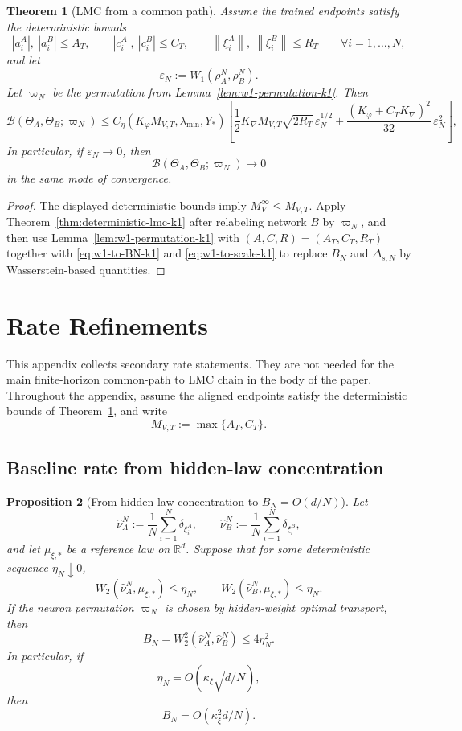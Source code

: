 \documentclass[11pt]{article}
\newtheorem{theorem}{Theorem}
\newtheorem{proposition}[theorem]{Proposition}
\theoremstyle{definition}
\newcommand{\R}{\mathbb{R}}
\newcommand{\norm}[1]{\left\lVert #1 \right\rVert}
\newcommand{\cB}{\mathcal{B}}
\begin{document}
\begin{theorem}[LMC from a common path]
\label{thm:lmc-from-common-path-k1}
Assume the trained endpoints satisfy the deterministic bounds
\[
  |a_i^A|,\ |a_i^B|\le A_T,
  \qquad
  |c_i^A|,\ |c_i^B|\le C_T,
  \qquad
  \norm{\xi_i^A},\ \norm{\xi_i^B}\le R_T
  \qquad
  \forall i=1,\dots,N,
\]
and let
\[
  \varepsilon_N:=W_1(\rho_A^N,\rho_B^N).
\]
Let $\varpi_N$ be the permutation from Lemma~\ref{lem:w1-permutation-k1}. Then
\begin{equation}
  \cB(\Theta_A,\Theta_B;\varpi_N)
  \le
  C_\eta(K_\varphi M_{V,T},\lambda_{\min},Y_\ast)
  \left[
    \frac12 K_{\nabla}M_{V,T}\sqrt{2R_T}\,\varepsilon_N^{1/2}
    +
    \frac{(K_\varphi+C_TK_{\nabla})^2}{32}\,\varepsilon_N^2
  \right],
  \label{eq:lmc-common-path-bound-k1}
\end{equation}
In particular, if $\varepsilon_N\to 0$, then
\[
  \cB(\Theta_A,\Theta_B;\varpi_N)\to 0
\]
in the same mode of convergence.
\end{theorem}

\begin{proof}
The displayed deterministic bounds imply $M_V^\infty\le M_{V,T}$. Apply
Theorem~\ref{thm:deterministic-lmc-k1} after relabeling network $B$ by
$\varpi_N$, and then use Lemma~\ref{lem:w1-permutation-k1} with
$(A,C,R)=(A_T,C_T,R_T)$ together with \eqref{eq:w1-to-BN-k1} and
\eqref{eq:w1-to-scale-k1} to
replace $B_N$ and $\Delta_{s,N}$ by Wasserstein-based quantities.
\end{proof}

\section{Rate Refinements}

This appendix collects secondary rate statements. They are not needed for the
main finite-horizon common-path to LMC chain in the body of the paper.
Throughout the appendix, assume the aligned endpoints satisfy the deterministic
bounds of Theorem~\ref{thm:lmc-from-common-path-k1}, and write
\[
  M_{V,T}:=\max\{A_T,C_T\}.
\]

\subsection{Baseline rate from hidden-law concentration}

\begin{proposition}[From hidden-law concentration to $B_N=O(d/N)$]
\label{prop:BN-from-w2-k1}
Let
\[
  \hat\nu_A^N:=\frac1N\sum_{i=1}^N \delta_{\xi_i^A},
  \qquad
  \hat\nu_B^N:=\frac1N\sum_{i=1}^N \delta_{\xi_i^B},
\]
and let $\mu_{\xi,\ast}$ be a reference law on $\R^d$. Suppose that for some
deterministic sequence $\eta_N\downarrow 0$,
\[
  W_2(\hat\nu_A^N,\mu_{\xi,\ast})\le \eta_N,
  \qquad
  W_2(\hat\nu_B^N,\mu_{\xi,\ast})\le \eta_N.
\]
If the neuron permutation $\varpi_N$ is chosen by hidden-weight optimal transport,
then
\begin{equation}
  B_N = W_2^2(\hat\nu_A^N,\hat\nu_B^N)\le 4\eta_N^2.
  \label{eq:BN-via-w2-k1}
\end{equation}
In particular, if
\[
  \eta_N=O(\kappa_\xi\sqrt{d/N}),
\]
then
\[
  B_N=O(\kappa_\xi^2 d/N).
\]
\end{proposition}
\end{document}
